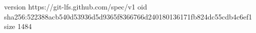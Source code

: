 version https://git-lfs.github.com/spec/v1
oid sha256:522388acb540d53936d5d9365f8366766d240180136171fb824dc55cdb4c6ef1
size 1484
